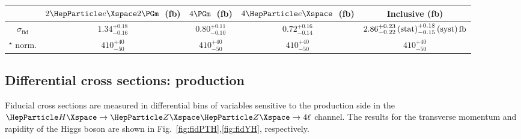 \begin{table}[!htb]
	\centering
	\renewcommand{\arraystretch}{1.5}
	\begin{tabular}{ccccc}
		& $2\Pe 2\Pgm$~(fb) & $4\Pgm$~(fb) & $4\Pe$~(fb) & Inclusive (fb) \\
		\hline
		$\sigma_{{\mathrm{fid}}} $& $1.34^{+0.18}_{-0.16}$ & $0.80^{+0.11}_{-0.10}$ & $0.72^{+0.16}_{-0.14}$ &  $2.86^{+0.23}_{-0.22}\,\text{(stat)}^{+0.18}_{-0.15}\,\text{(syst)} \text{\,fb}$  \\
		 \PZ\PZ$^\star$ norm. & $410^{+40}_{-50}$ & $410^{+40}_{-50}$ & $410^{+40}_{-50}$ & $410^{+40}_{-50}$   \\
	\end{tabular}
\end{table}


\subsection{Differential cross sections: production}
Fiducial cross sections are measured in differential bins of variables sensitive to the production side in the $\HZZfl$ channel.
The results for the transverse momentum and rapidity of the Higgs boson are shown in Fig.~\ref{fig:fidPTH},\ref{fig:fidYH}, respectively.


